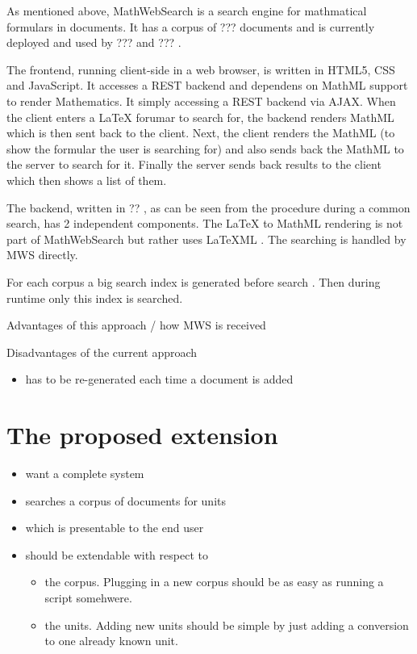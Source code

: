\documentclass[11pt]{article}
\begin{document}
As mentioned above, MathWebSearch is a search engine for mathmatical formulars in documents. It has a corpus of ???  documents and is currently deployed and used by ??? and ??? .

The frontend, running client-side in a web browser, is written in HTML5, CSS and JavaScript. It accesses a REST backend and dependens on MathML support to render Mathematics. It simply accessing a REST backend via AJAX. When the client enters a LaTeX forumar to search for, the backend renders MathML which is then sent back to the client. Next, the client renders the MathML (to show the formular the user is searching for) and also sends back the MathML to the server to search for it. Finally the server sends back results to the client which then shows a list of them.

The backend, written in ?? , as can be seen from the procedure during a common search, has 2 independent components. The LaTeX to MathML rendering is not part of MathWebSearch but rather uses LaTeXML . The searching is handled by MWS directly.

For each corpus a big search index is generated before search . Then during runtime only this index is searched. 


Advantages of this approach / how MWS is received

Disadvantages of the current approach
\begin{itemize}
  \item has to be re-generated each time a document is added
\end{itemize}

\section{The proposed extension}
\label{sec:extension}

\begin{itemize}
  \item want a complete system
  \item searches a corpus of documents for units
  \item which is presentable to the end user
  \item should be extendable with respect to
  \begin{itemize}
    \item the corpus. Plugging in a new corpus should be as easy as running a script somehwere.
    \item the units. Adding new units should be simple by just adding a conversion to one already known unit.
  \end{itemize}
\end{itemize}
\end{document}
